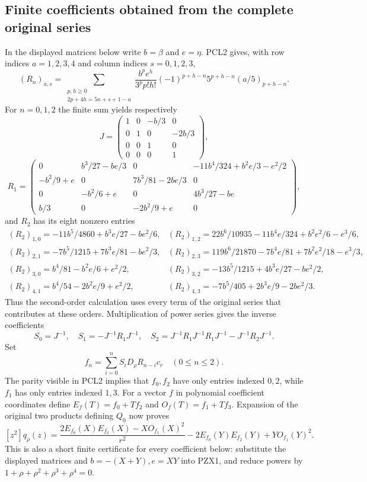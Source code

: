 \subsection{Finite coefficients obtained from the complete original series}
In the displayed matrices below write $b=\beta$ and $e=\eta$.
PCL2 gives, with row indices $a=1,2,3,4$ and column indices
$s=0,1,2,3$,
\[
 (R_n)_{a,s}=
 \sum_{\substack{p,h\ge0\\2p+4h=5n+s+1-a}}
 \frac{b^pe^h}{3^p p!h!}(-1)^{p+h-n}5^{p+h-n}(a/5)_{p+h-n}.
\]
For $n=0,1,2$ the finite sum yields respectively
\[
 J=\begin{pmatrix}1&0&-b/3&0\\0&1&0&-2b/3\\0&0&1&0\\0&0&0&1\end{pmatrix},
\]
\[
 R_1=\begin{pmatrix}
0&b^3/27-be/3&0&-11b^4/324+b^2e/3-e^2/2\\
-b^2/9+e&0&7b^3/81-2be/3&0\\
0&-b^2/6+e&0&4b^3/27-be\\
b/3&0&-2b^2/9+e&0
\end{pmatrix},
\]
and $R_2$ has its eight nonzero entries
\[
\begin{array}{ll}
(R_2)_{1,0}=-11b^5/4860+b^3e/27-be^2/6,&
(R_2)_{1,2}=22b^6/10935-11b^4e/324+b^2e^2/6-e^3/6,\\
(R_2)_{2,1}=-7b^5/1215+7b^3e/81-be^2/3,&
(R_2)_{2,3}=119b^6/21870-7b^4e/81+7b^2e^2/18-e^3/3,\\
(R_2)_{3,0}=b^4/81-b^2e/6+e^2/2,&
(R_2)_{3,2}=-13b^5/1215+4b^3e/27-be^2/2,\\
(R_2)_{4,1}=b^4/54-2b^2e/9+e^2/2,&
(R_2)_{4,3}=-7b^5/405+2b^3e/9-2be^2/3.
\end{array}
\]
Thus the second-order calculation uses every term of the original
series that contributes at these orders.  Multiplication of power
series gives the inverse coefficients
\[
 S_0=J^{-1},\quad S_1=-J^{-1}R_1J^{-1},\quad
 S_2=J^{-1}R_1J^{-1}R_1J^{-1}-J^{-1}R_2J^{-1}.
\]
Set
\[
 f_n=\sum_{i=0}^n S_iD_\rho R_{n-i}c_r \quad(0\le n\le2).
\]
The parity visible in PCL2 implies that $f_0,f_2$ have only entries
indexed $0,2$, while $f_1$ has only entries indexed $1,3$.
For a vector $f$ in polynomial coefficient coordinates define
$E_f(T)=f_0+Tf_2$ and $O_f(T)=f_1+Tf_3$.
Expansion of the original two products defining $Q_0$ now proves
\[
 [z^2]q_\rho(z)=
 \frac{2E_{f_0}(X)E_{f_2}(X)-X O_{f_1}(X)^2}{r^2}
 -2E_{f_0}(Y)E_{f_2}(Y)+Y O_{f_1}(Y)^2.                 \tag{PZX1}
\]
This is also a short finite certificate for every coefficient below:
substitute the displayed matrices and $b=-(X+Y),e=XY$ into PZX1,
and reduce powers by $1+\rho+\rho^2+\rho^3+\rho^4=0$.


